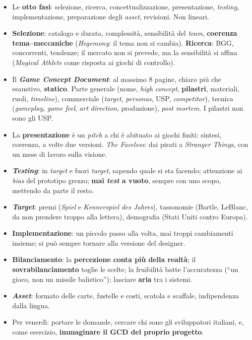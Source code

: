 \begin{itemize}
        editore non può permettersi di sbagliare.
  \item Le \textbf{otto fasi}: selezione, ricerca, concettualizzazione, presentazione,
        \emph{testing}, implementazione, preparazione degli \emph{asset}, revisioni. Non
        lineari.
  \item \textbf{Selezione}: catalogo e durata, complessità, sensibilità del \emph{team},
        \textbf{coerenza tema--meccaniche} (\emph{Hegemony}: il tema non si cambia).
        \textbf{Ricerca}: BGG, concorrenti, tendenze; il mercato non si prevede, ma la
        sensibilità si affina (\emph{Magical Athlete} come risposta ai giochi di controllo).
  \item Il \textbf{\emph{Game Concept Document}}: al massimo 8 pagine, chiaro più che
        esaustivo, \textbf{statico}. Parte generale (nome, \emph{high concept},
        \textbf{pilastri}, materiali, ruoli, \emph{timeline}), commerciale (\emph{target},
        \emph{personas}, USP, \emph{competitor}), tecnica (\emph{gameplay}, \emph{game feel},
        \emph{art direction}, produzione), \emph{post mortem}. I pilastri non sono gli USP.
  \item La \textbf{presentazione} è un \emph{pitch} a chi è abituato ai giochi finiti: sintesi,
        coerenza, a volte due versioni. \emph{The Faceless}: dai pirati a \emph{Stranger
        Things}, con un mese di lavoro sulla visione.
  \item \textbf{\emph{Testing}}: in \emph{target} e fuori \emph{target}, sapendo quale si sta
        facendo; attenzione ai \emph{bias} del prototipo grezzo; \textbf{mai \emph{test} a
        vuoto}, sempre con uno scopo, mettendo da parte il resto.
  \item \textbf{\emph{Target}}: premi (\emph{Spiel} e \emph{Kennerspiel des Jahres}),
        tassonomie (Bartle, LeBlanc, da non prendere troppo alla lettera), demografia
        (Stati Uniti contro Europa).
  \item \textbf{Implementazione}: un piccolo passo alla volta, mai troppi cambiamenti insieme;
        si può sempre tornare alla versione del designer.
  \item \textbf{Bilanciamento}: la \textbf{percezione conta più della realtà}; il
        \textbf{sovrabilanciamento} toglie le scelte; la fruibilità batte l'accuratezza
        (``un gioco, non un missile balistico''); lasciare \textbf{aria} tra i sistemi.
  \item \textbf{\emph{Asset}}: formato delle carte, fustelle e costi, scatola e scaffale,
        indipendenza dalla lingua.
  \item Per venerdì: portare le domande, cercare chi sono gli sviluppatori italiani, e,
        come esercizio, \textbf{immaginare il GCD del proprio progetto}.
\end{itemize}
